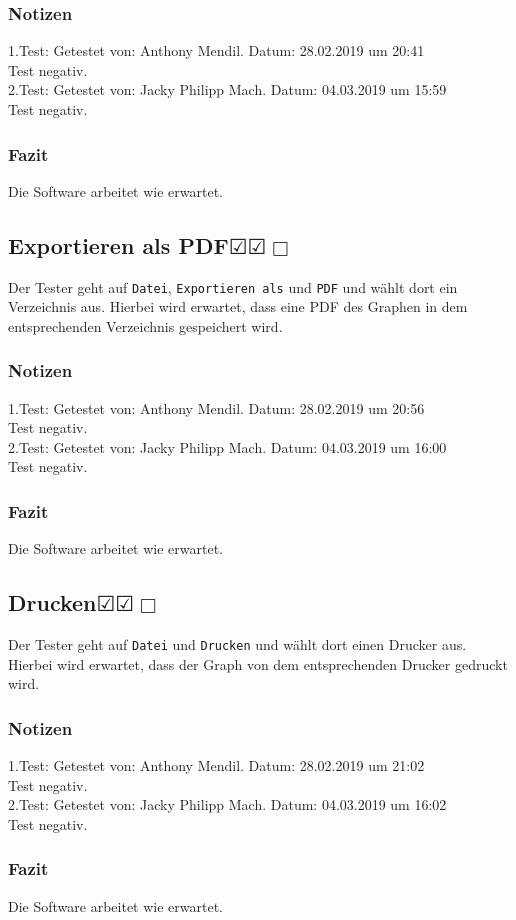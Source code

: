 \documentclass[enabledeprecatedfontcommands]{scrartcl}
\newcommand{\subsectiont}[2]{\subsection[#1]{#1{\normalsize\normalfont #2}}}
\newcommand{\leer}{$\Box$}
\newcommand{\ok}{$\CheckedBox$}
\begin{document}
\subsubsection{Notizen}
1.Test: Getestet von: Anthony Mendil. Datum: 28.02.2019 um 20:41 \\
Test negativ.\\
2.Test: Getestet von: Jacky Philipp Mach. Datum: 04.03.2019 um 15:59 \\
Test negativ.
\subsubsection{Fazit}
Die Software arbeitet wie erwartet.

\subsectiont{Exportieren als PDF}{\dotfill\ok\ok\leer}
Der Tester geht auf \texttt{Datei}, \texttt{Exportieren als} und \texttt{PDF} und wählt dort ein Verzeichnis aus. Hierbei wird erwartet, dass eine PDF des Graphen in dem entsprechenden Verzeichnis gespeichert wird. 
\subsubsection{Notizen}
1.Test: Getestet von: Anthony Mendil. Datum: 28.02.2019 um 20:56 \\
Test negativ.\\
2.Test: Getestet von: Jacky Philipp Mach. Datum: 04.03.2019 um 16:00 \\
Test negativ.
\subsubsection{Fazit}
Die Software arbeitet wie erwartet.

\subsectiont{Drucken}{\dotfill\ok\ok\leer}
Der Tester geht auf \texttt{Datei} und \texttt{Drucken} und wählt dort einen Drucker aus. Hierbei wird erwartet, dass der Graph von dem entsprechenden Drucker gedruckt wird. 
\subsubsection{Notizen}
1.Test: Getestet von: Anthony Mendil. Datum: 28.02.2019 um 21:02 \\
Test negativ.\\
2.Test: Getestet von: Jacky Philipp Mach. Datum: 04.03.2019 um 16:02\\
Test negativ.
\subsubsection{Fazit}
Die Software arbeitet wie erwartet.
\end{document}
